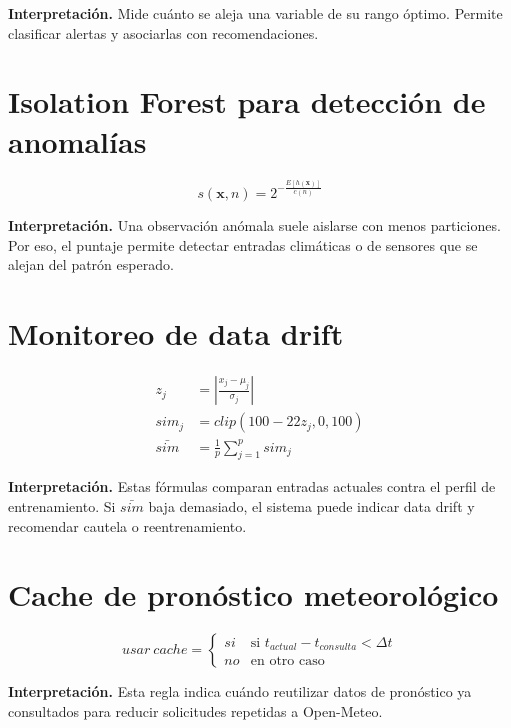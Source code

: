 \documentclass[12pt,letterpaper,oneside]{report}
\begin{document}
\textbf{Interpretación.} Mide cuánto se aleja una variable de su rango óptimo. Permite clasificar alertas y asociarlas con recomendaciones.

\section{Isolation Forest para detección de anomalías}
\begin{equation}
s(\mathbf{x},n)=2^{-\frac{E[h(\mathbf{x})]}{c(n)}}
\end{equation}

\textbf{Interpretación.} Una observación anómala suele aislarse con menos particiones. Por eso, el puntaje permite detectar entradas climáticas o de sensores que se alejan del patrón esperado.

\section{Monitoreo de data drift}
\begin{align}
z_j &= \left|\frac{x_j-\mu_j}{\sigma_j}\right| \\
sim_j &= clip(100-22z_j,0,100) \\
\bar{sim} &= \frac{1}{p}\sum_{j=1}^{p}sim_j
\end{align}

\textbf{Interpretación.} Estas fórmulas comparan entradas actuales contra el perfil de entrenamiento. Si $\bar{sim}$ baja demasiado, el sistema puede indicar data drift y recomendar cautela o reentrenamiento.

\section{Cache de pronóstico meteorológico}
\begin{equation}
usar\ cache=\begin{cases}
si & \text{si } t_{actual}-t_{consulta}<\Delta t \\
no & \text{en otro caso}
\end{cases}
\end{equation}

\textbf{Interpretación.} Esta regla indica cuándo reutilizar datos de pronóstico ya consultados para reducir solicitudes repetidas a Open-Meteo.

\end{document}
